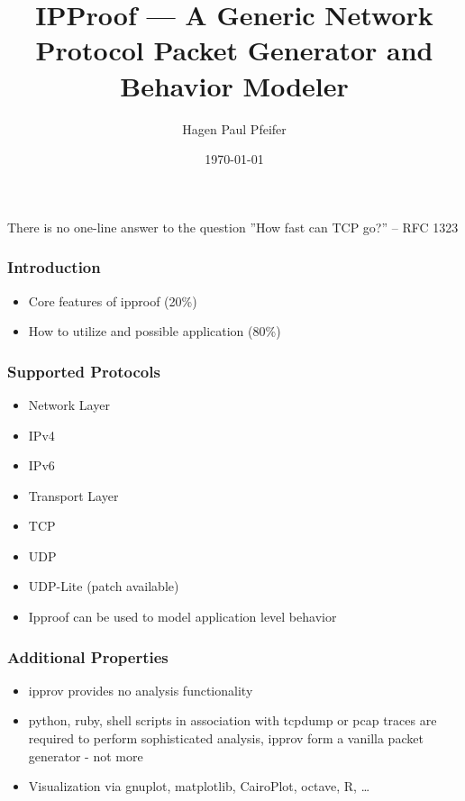 \documentclass[xcolor=pdftex,dvipsnames,table]{beamer}
\author{Hagen Paul Pfeifer}
\title{IPProof --- A Generic Network Protocol Packet Generator and Behavior Modeler}
\date{\today}
\begin{document}
\begin{frame}
\titlepage
\end{frame}




\begin{frame}
\frametitle{}
\textsf{There is no one-line answer to the question ''How fast can TCP go?'' -- RFC 1323}
\end{frame}




\begin{frame}
\frametitle{Introduction}
\begin{itemize}
	\item Core features of ipproof (20\%)
	\item How to utilize and possible application (80\%)
\end{itemize}
\end{frame}


\begin{frame}
\frametitle{Supported Protocols}
\begin{itemize}
	\item Network Layer
	\bi
		\item IPv4
		\item IPv6
	\ei
	\item Transport Layer
	\bi
		\item TCP
		\item UDP
		\item UDP-Lite (patch available)
	\ei
	\item Ipproof can be used to model application level behavior
\end{itemize}
\end{frame}



\begin{frame}
\frametitle{Additional Properties}
\begin{itemize}
	\item ipprov provides no analysis functionality
	\item python, ruby, shell scripts in association with tcpdump or pcap traces are required to perform sophisticated analysis,
	ipprov form a vanilla packet generator - not more
	\item Visualization via gnuplot, matplotlib, CairoPlot, octave, R, \dots
\end{itemize}
\end{frame}
\end{document}
